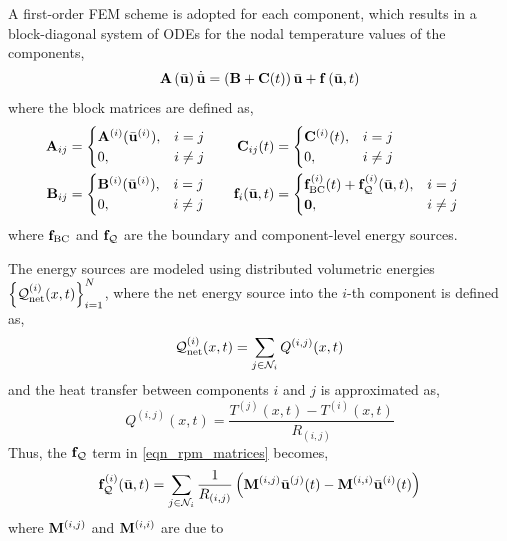 A first-order FEM scheme is adopted for each component, which results in a block-diagonal system of ODEs for the nodal temperature values of the components,
\begin{equation}
    \mathbf{A}\left(\bar{\mathbf{u}}\right)\dot{\bar{\mathbf{u}}} = \left(\mathbf{B} + \mathbf{C}(t)\right)\bar{\mathbf{u}} + \mathbf{f}\left(\bar{\mathbf{u}},t\right)\label{eqn_rpm}
\end{equation}
where the block matrices are defined as,
\begin{subequations}
\begin{align}
\begin{aligned}
    \mathbf{A}_{ij} &= \begin{cases}
        \mathbf{A}^{(i)}(\bar{\mathbf{u}}^{(i)}), & i=j \\
        0, & i\neq j
    \end{cases}\\
    \mathbf{B}_{ij} &= \begin{cases}
        \mathbf{B}^{(i)}(\bar{\mathbf{u}}^{(i)}), & i=j \\
        0, & i\neq j
    \end{cases}
\end{aligned}
&\qquad
\begin{aligned}
    \mathbf{C}_{ij}(t) &= \begin{cases}
        \mathbf{C}^{(i)}(t), & i=j \\
        0, & i\neq j
    \end{cases}\\
    \mathbf{f}_i(\bar{\mathbf{u}},t) &= \begin{cases}
        \mathbf{f}^{(i)}_{\text{BC}}(t)+\mathbf{f}^{(i)}_{\mathcal{Q}}(\bar{\mathbf{u}},t), & i=j \\
        \boldsymbol{0}, & i\neq j
    \end{cases}
\end{aligned}\label{eqn_rpm_matrices}
\end{align}
\end{subequations}
where $\mathbf{f}_{\text{BC}}$ and $\mathbf{f}_{\mathcal{Q}}$ are the boundary and component-level energy sources. 

The energy sources are modeled using distributed volumetric energies $\left\{\mathcal{Q}_{\text{net}}^{(i)}(x,t)\right\}_{i=1}^{N}$, where the net energy source into the $i$-th component is defined as,
\begin{equation}
    \mathcal{Q}_{\text{net}}^{(i)}(x,t) = \sum_{j\in\mathcal{N}_i}Q^{(i,j)}(x,t)\label{eqn_net_volumetric_energy}
\end{equation}
and the heat transfer between components $i$ and $j$ is approximated as,
\begin{equation}
    Q^{(i,j)}(x,t) = \frac{T^{(j)}(x,t) - T^{(i)}(x,t)}{R_{(i,j)}}
\end{equation}
Thus, the $\mathbf{f}_{\mathcal{Q}}$ term in \cref{eqn_rpm_matrices} becomes,
\begin{equation}
    \mathbf{f}_{\mathcal{Q}}^{(i)}(\bar{\mathbf{u}},t) = \sum_{j\in\mathcal{N}_i} \frac{1}{R_{(i,j)}}\left(\mathbf{M}^{(i,j)}\bar{\mathbf{u}}^{(j)}(t) - \mathbf{M}^{(i,i)}\bar{\mathbf{u}}^{(i)}(t)\right)
\end{equation}
where $\mathbf{M}^{(i,j)}$ and $\mathbf{M}^{(i,i)}$ are due to 

